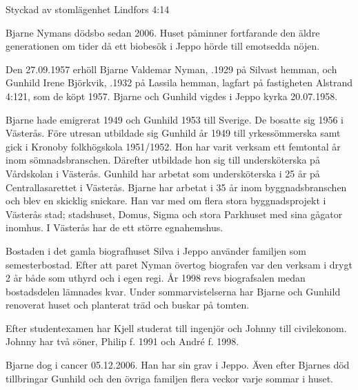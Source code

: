 
Styckad av stomlägenhet Lindfors 4:14


Bjarne Nymans dödsbo sedan 2006. Huset påminner fortfarande den äldre generationen om tider då ett biobesök i Jeppo hörde till emotsedda nöjen.\jhvspace{}


Den 27.09.1957 erhöll Bjarne Valdemar Nyman, .1929 på Silvast hemman, och Gunhild Irene Björkvik, .1932 på Lassila hemman, lagfart på fastigheten Alstrand 4:121, som de köpt 1957. Bjarne och Gunhild vigdes i Jeppo kyrka 20.07.1958.

Bjarne	hade emigrerat 1949 och Gunhild 1953 till Sverige. De	bosatte sig 1956 i Västerås. Före utresan utbildade sig Gunhild år 1949 till yrkessömmerska samt gick i Kronoby folkhögskola 1951/1952. Hon har varit verksam ett femtontal år inom sömnadsbranschen. Därefter utbildade hon sig till	undersköterska på Vårdskolan i Västerås. Gunhild har arbetat som undersköterska i 25 år på Centrallasarettet i	Västerås. Bjarne har arbetat i 35 år inom byggnadsbranschen	och blev en skicklig snickare. Han var med om flera stora	byggnadsprojekt i Västerås stad; stadshuset, Domus, Sigma	och stora Parkhuset med sina gågator inomhus. I Västerås har de ett större egnahemshus.

Bostaden i det gamla biografhuset Silva i Jeppo använder familjen som semesterbostad. Efter att paret Nyman övertog	biografen var den verksam i drygt 2 år både som uthyrd och i egen regi. År 1998 revs biografsalen medan bostadsdelen lämnades kvar. Under sommarvistelserna har Bjarne och Gunhild renoverat huset och planterat träd och buskar på tomten.
\begin{jhchildren}
  \item {}
  \item {}
\end{jhchildren}
Efter studentexamen har Kjell studerat till ingenjör och Johnny till civilekonom. Johnny har två söner, Philip f. 1991 och André f. 1998.

Bjarne dog i cancer 05.12.2006. Han har sin grav i Jeppo. Även efter Bjarnes död tillbringar Gunhild och den övriga familjen flera veckor varje sommar i huset.


